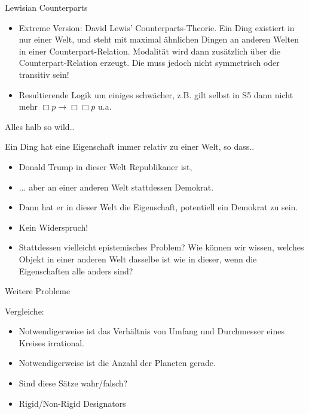 \documentclass[12pt]{beamer}
\begin{document}
\begin{frame}{Lewisian Counterparts}

\begin{itemize}[<+->]
\item Extreme Version: David Lewis' Counterparts-Theorie. Ein Ding existiert in nur einer Welt, und steht mit maximal ähnlichen Dingen an anderen Welten in einer Counterpart-Relation. Modalität wird dann zusätzlich über die Counterpart-Relation erzeugt. Die muss jedoch nicht symmetrisch oder transitiv sein!
\item Resultierende Logik um einiges schwächer, z.B. gilt selbst in S5 dann nicht mehr $\Box p \to \Box\Box p$ u.a.
\end{itemize}

\end{frame}

\begin{frame}{Alles halb so wild..}

Ein Ding hat eine Eigenschaft immer relativ zu einer Welt, so dass..
\begin{itemize}[<+->]
\item Donald Trump in dieser Welt Republikaner ist,
\item ... aber an einer anderen Welt stattdessen Demokrat.
\item Dann hat er in dieser Welt die Eigenschaft, potentiell ein Demokrat zu sein.
\item Kein Widerspruch!
\item Stattdessen vielleicht epistemisches Problem? Wie können wir wissen, welches Objekt in einer anderen Welt dasselbe ist wie in dieser, wenn die Eigenschaften alle anders sind?
\end{itemize}
\end{frame}

\begin{frame}{Weitere Probleme}

Vergleiche:
\begin{itemize}[<+->]
\item Notwendigerweise ist das Verhältnis von Umfang und Durchmesser eines Kreises irrational.
\item Notwendigerweise ist die Anzahl der Planeten gerade.
\item Sind diese Sätze wahr/falsch?
\item Rigid/Non-Rigid Designators
\end{itemize}


\end{frame}
\end{document}
